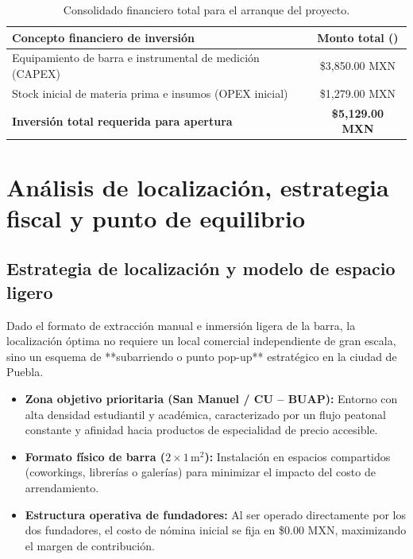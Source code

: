 \documentclass{article}
\begin{document}
\begin{table}[H]
	\centering
	\caption{Consolidado financiero total para el arranque del proyecto.}
	\label{tab:resumen_totales}
	\vspace{6pt}
	\begin{tabular}{lc}
		\toprule
		\textbf{Concepto financiero de inversión} & \textbf{Monto total (\text{\$ MXN})} \\
		\midrule
		Equipamiento de barra e instrumental de medición (CAPEX) & \$3,850.00 MXN \\
		Stock inicial de materia prima e insumos (OPEX inicial) & \$1,279.00 MXN \\
		\midrule
		\textbf{Inversión total requerida para apertura} & \textbf{\$5,129.00 MXN} \\
		\bottomrule
	\end{tabular}
\end{table}


\section{Análisis de localización, estrategia fiscal y punto de equilibrio}

\subsection{Estrategia de localización y modelo de espacio ligero}

Dado el formato de extracción manual e inmersión ligera de la barra, la localización óptima no requiere un local comercial independiente de gran escala, sino un esquema de **subarriendo o punto pop-up** estratégico en la ciudad de Puebla.

\begin{itemize}
	\item[$\bullet$] \textbf{Zona objetivo prioritaria (San Manuel / CU -- BUAP):} Entorno con alta densidad estudiantil y académica, caracterizado por un flujo peatonal constante y afinidad hacia productos de especialidad de precio accesible.
	\item[$\bullet$] \textbf{Formato físico de barra ($2 \times 1\,\text{m}^2$):} Instalación en espacios compartidos (coworkings, librerías o galerías) para minimizar el impacto del costo de arrendamiento.
	\item[$\bullet$] \textbf{Estructura operativa de fundadores:} Al ser operado directamente por los dos fundadores, el costo de nómina inicial se fija en \$0.00 MXN, maximizando el margen de contribución.
\end{itemize}
\end{document}

